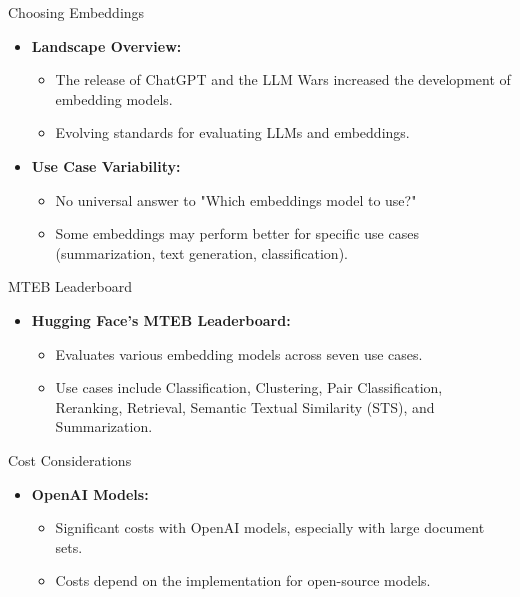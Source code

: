 \begin{frame}[fragile]{Choosing Embeddings}
  \begin{itemize}
    \item \textbf{Landscape Overview:}
      \begin{itemize}
        \item The release of ChatGPT and the LLM Wars increased the development of embedding models.
        \item Evolving standards for evaluating LLMs and embeddings.
      \end{itemize}
    \item \textbf{Use Case Variability:}
      \begin{itemize}
        \item No universal answer to "Which embeddings model to use?"
        \item Some embeddings may perform better for specific use cases (summarization, text generation, classification).
      \end{itemize}
  \end{itemize}
\end{frame}

\begin{frame}[fragile]{MTEB Leaderboard}
  \begin{itemize}
    \item \textbf{Hugging Face's MTEB Leaderboard:}
      \begin{itemize}
        \item Evaluates various embedding models across seven use cases.
        \item Use cases include Classification, Clustering, Pair Classification, Reranking, Retrieval, Semantic Textual Similarity (STS), and Summarization.
      \end{itemize}
  \end{itemize}
\end{frame}

\begin{frame}[fragile]{Cost Considerations}
  \begin{itemize}
    \item \textbf{OpenAI Models:}
      \begin{itemize}
        \item Significant costs with OpenAI models, especially with large document sets.
        \item Costs depend on the implementation for open-source models.
      \end{itemize}
  \end{itemize}
\end{frame}

